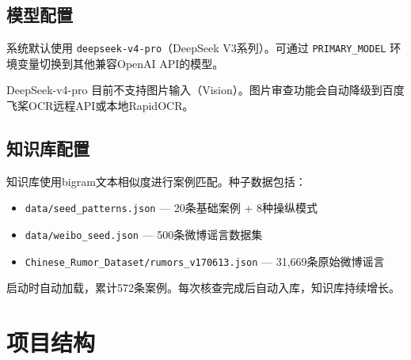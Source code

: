 \documentclass[12pt,a4paper]{ctexart}
\begin{document}
\subsection{模型配置}

系统默认使用 \texttt{deepseek-v4-pro}（DeepSeek V3系列）。可通过 \texttt{PRIMARY\_MODEL} 环境变量切换到其他兼容OpenAI API的模型。

\begin{warnbox}
DeepSeek-v4-pro 目前不支持图片输入（Vision）。图片审查功能会自动降级到百度飞桨OCR远程API或本地RapidOCR。
\end{warnbox}

\subsection{知识库配置}

知识库使用bigram文本相似度进行案例匹配。种子数据包括：
\begin{itemize}
    \item \texttt{data/seed\_patterns.json} — 20条基础案例 + 8种操纵模式
    \item \texttt{data/weibo\_seed.json} — 500条微博谣言数据集
    \item \texttt{Chinese\_Rumor\_Dataset/rumors\_v170613.json} — 31,669条原始微博谣言
\end{itemize}

启动时自动加载，累计572条案例。每次核查完成后自动入库，知识库持续增长。

\section{项目结构}
\end{document}
